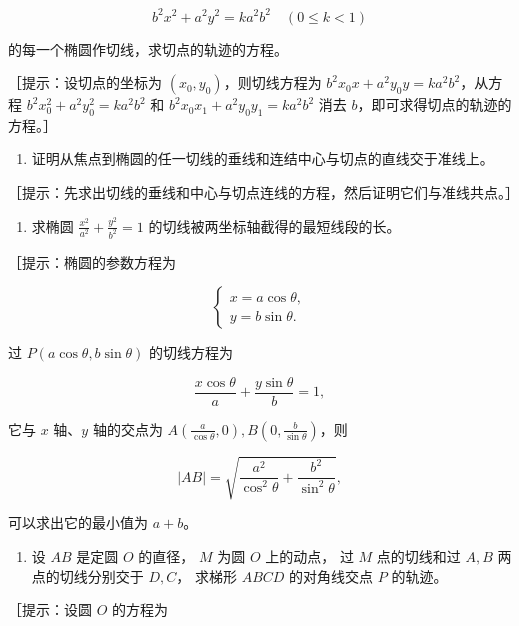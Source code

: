 \[
b^{2} x^{2} + a^{2} y^{2} = k a^{2} b^{2} \quad (0 \leqslant k < 1)
\]

的每一个椭圆作切线，求切点的轨迹的方程。

［提示：设切点的坐标为 \((x_0, y_0)\)，则切线方程为
\(b^2 x_0 x + a^2 y_0 y = ka^2 b^2\)，从方程
\(b^2 x_0^2 + a^2 y_0^2 = ka^2 b^2\) 和
\(b^2 x_0 x_1 + a^2 y_0 y_1 = ka^2 b^2\) 消去
\(b\)，即可求得切点的轨迹的方程。］

\begin{enumerate}
\def\labelenumi{\arabic{enumi}.}
\setcounter{enumi}{13}
\tightlist
\item
  证明从焦点到椭圆的任一切线的垂线和连结中心与切点的直线交于准线上。
\end{enumerate}

［提示：先求出切线的垂线和中心与切点连线的方程，然后证明它们与准线共点。］

\begin{enumerate}
\def\labelenumi{\arabic{enumi}.}
\setcounter{enumi}{14}
\tightlist
\item
  求椭圆 \(\frac{x^2}{a^2} + \frac{y^2}{b^2} = 1\)
  的切线被两坐标轴截得的最短线段的长。
\end{enumerate}

［提示：椭圆的参数方程为

\[
\left\{ \begin{array}{l} x = a \cos \theta, \\ y = b \sin \theta. \end{array} \right.
\]

过 \(P(a\cos \theta ,b\sin \theta)\) 的切线方程为

\[
\frac {x \cos \theta}{a} + \frac {y \sin \theta}{b} = 1,
\]

它与 \(x\) 轴、\(y\) 轴的交点为
\(A\left(\frac{a}{\cos\theta}, 0\right), B\left(0, \frac{b}{\sin\theta}\right)\)，则

\[
\vert AB \vert = \sqrt {\frac {a^{2}}{\cos^{2} \theta} + \frac {b^{2}}{\sin^{2} \theta}},
\]

可以求出它的最小值为 \(a + b\)。

\begin{enumerate}
\def\labelenumi{\arabic{enumi}.}
\setcounter{enumi}{15}
\tightlist
\item
  设 \(AB\) 是定圆 \(O\) 的直径， \(M\) 为圆 \(O\) 上的动点， 过 \(M\)
  点的切线和过 \(A, B\) 两点的切线分别交于 \(D, C\)， 求梯形 \(ABCD\)
  的对角线交点 \(P\) 的轨迹。
\end{enumerate}

［提示：设圆 \(O\) 的方程为

